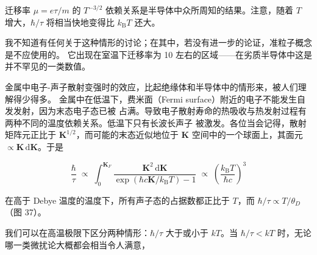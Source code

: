 迁移率 $\mu = e\tau/m$ 的 $T^{-3/2}$ 依赖关系是半导体中众所周知的结果。注意，随着 $T$
增大，$\hbar/\tau$ 将相当快地变得比 $k_{\mathrm{B}}T$ 还大。

我不知道有任何关于这种情形的讨论；在其中，若没有进一步的论证，准粒子概念是不应使用的。
它出现在室温下迁移率为 10 左右的区域——在劣质半导体中这是并不罕见的一类数值。

金属中电子-声子散射变强时的效应，比起绝缘体和半导体中的情形来，被人们理解得少得多。
金属中在低温下，费米面（Fermi surface）附近的电子不能发生自发发射，因为末态电子态已被
占满。导致电子散射寿命的热吸收与热发射过程有两种不同的温度依赖关系。低温下只有长波长声子
被激发。各位当会记得，散射矩阵元正比于 $\mathbf{K}^{1/2}$，而可能的末态近似地位于
$\mathbf{K}$ 空间中的一个球面上，其面元 $\propto \mathbf{K}\,\mathrm{d}\mathbf{K}$。于是

\begin{equation*}
\frac{\hbar}{\tau} \;\propto\; \int_{0}^{\mathbf{K}_{F}} \frac{\mathbf{K}^{2}\,\mathrm{d}\mathbf{K}}{\exp(\hbar c\mathbf{K}/k_{\mathrm{B}}T) - 1} \;\propto\; \left(\frac{k_{\mathrm{B}}T}{\hbar c}\right)^{3}
\end{equation*}

在高于 Debye 温度的温度下，所有声子态的占据数都正比于 $T$，而
$\hbar/\tau \propto T/\theta_{D}$（图 37）。

我们可以在高温极限下区分两种情形：$\hbar/\tau$ 大于或小于 $kT$。当 $\hbar/\tau < kT$
时，无论哪一类微扰论大概都会相当令人满意，


